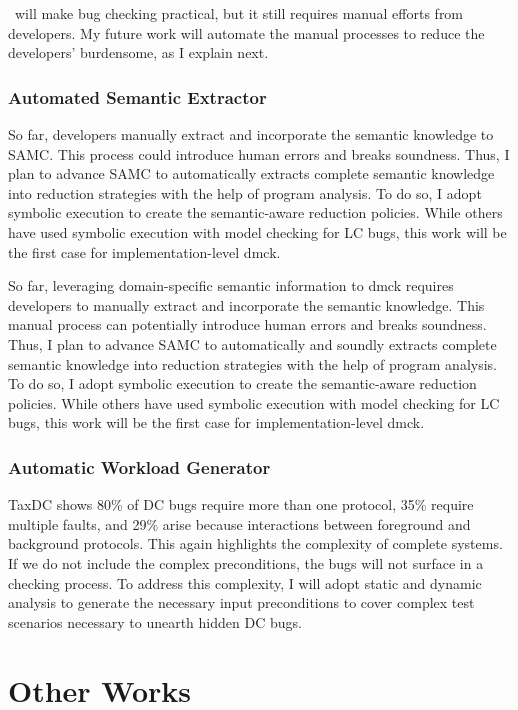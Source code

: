 \documentclass[11pt]{article}
\begin{document}
\fullcheck\ will make bug checking practical, but it still requires manual
efforts from developers. My future work will automate the manual processes
to reduce the developers' burdensome, as I explain next.

\subsubsection*{Automated Semantic Extractor}

So far, developers manually extract and incorporate the semantic knowledge to
SAMC. This process could introduce human errors and breaks soundness. Thus, I
plan to advance SAMC to automatically extracts complete semantic
knowledge into reduction strategies with the help of program analysis. To do
so, I adopt symbolic execution to create the semantic-aware reduction policies.
While others have used symbolic execution with model checking for LC bugs, this
work will be the first case for implementation-level dmck. 

So far, leveraging domain-specific semantic information to dmck requires
developers to manually extract and incorporate the semantic knowledge. This
manual process can potentially introduce human errors and breaks soundness.
Thus, I plan to advance SAMC to automatically and soundly extracts complete
semantic knowledge into reduction strategies with the help of program analysis.
To do so, I adopt symbolic execution to create the semantic-aware reduction
policies. While others have used symbolic execution with model checking for LC
bugs, this work will be the first case for implementation-level dmck. 
\fi

\subsubsection*{Automatic Workload Generator}

TaxDC shows 80\% of DC bugs require more than one protocol, 35\% require
multiple faults, and 29\% arise because interactions between foreground and
background protocols. This again highlights the complexity of complete
systems. If we do not include the complex preconditions, the bugs will not
surface in a checking process. To address this complexity, I will adopt static
and dynamic analysis to generate the necessary input preconditions to cover
complex test scenarios necessary to unearth hidden DC bugs.

\section{Other Works}
\end{document}
